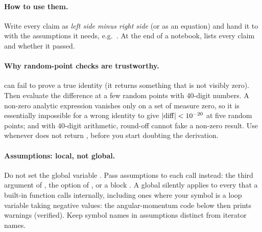 \documentclass[11pt,a4paper]{article}
\numberwithin{equation}{section}
\theoremstyle{definition}
\theoremstyle{plain}
\theoremstyle{remark}
\numberwithin{algorithm}{section}
\begin{document}
\paragraph{How to use them.} Write every claim as \emph{left side minus right side} (or as an equation) and hand it to  with the assumptions it needs, e.g.\ . At the end of a notebook,  lists every claim and whether it passed.

\paragraph{Why random-point checks are trustworthy.}  can fail to prove a true identity (it returns something that is not visibly zero). Then evaluate the difference at a few random points with 40-digit numbers. A non-zero analytic expression vanishes only on a set of measure zero, so it is essentially impossible for a wrong identity to give $|{\rm diff}|<10^{-20}$ at five random points; and with 40-digit arithmetic, round-off cannot fake a non-zero result. Use  whenever  does not return , before you start doubting the derivation.

\paragraph{Assumptions: local, not global.} Do not set the global variable . Pass assumptions to each call instead: the third argument of , the option  of , or a block . A global  silently applies to every  that a built-in function calls internally, including ones where your symbol  is a loop variable taking negative values: the angular-momentum code below then prints  warnings (verified). Keep symbol names in assumptions distinct from iterator names.

\end{document}
